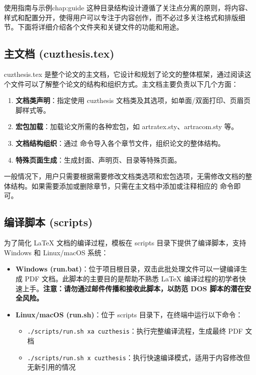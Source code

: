 \begin{cuzchapter}{使用指南与示例}{chap:guide}
    这种目录结构设计遵循了关注点分离的原则，将内容、样式和配置分开，使得用户可以专注于内容创作，而不必过多关注格式和排版细节。下面将详细介绍各个文件夹和关键文件的功能和用途。

    \subsection{主文档 (cuzthesis.tex)}\label{sub:cuzthesis}

    cuzthesis.tex 是整个论文的主文档，它设计和规划了论文的整体框架，通过阅读这个文件可以了解整个论文的结构和组织方式。主文档主要负责以下几个方面：

    \begin{enumerate}
        \item \textbf{文档类声明}：指定使用 cuzthesis 文档类及其选项，如单面/双面打印、页眉页脚样式等。
        \item \textbf{宏包加载}：加载论文所需的各种宏包，如 artratex.sty、artracom.sty 等。
        \item \textbf{文档结构组织}：通过 \verb|| 命令导入各个章节文件，组织论文的整体结构。
        \item \textbf{特殊页面生成}：生成封面、声明页、目录等特殊页面。
    \end{enumerate}

    一般情况下，用户只需要根据需要修改文档类选项和宏包选项，无需修改文档的整体结构。如果需要添加或删除章节，只需在主文档中添加或注释相应的 \verb|| 命令即可。

    \subsection{编译脚本 (scripts)}\label{sub:scripts}

    为了简化 \LaTeX{} 文档的编译过程，模板在 scripts 目录下提供了编译脚本，支持 Windows 和 Linux/macOS 系统：

    \begin{itemize}
        \item \textbf{Windows (run.bat)}：位于项目根目录，双击此批处理文件可以一键编译生成 PDF 文档。此脚本的主要目的是帮助不熟悉 \LaTeX{} 编译过程的初学者快速上手。\textbf{注意：请勿通过邮件传播和接收此脚本，以防范 DOS 脚本的潜在安全风险。}

        \item \textbf{Linux/macOS (run.sh)}：位于 scripts 目录下，在终端中运行以下命令：
              \begin{itemize}
                  \item \verb|./scripts/run.sh xa cuzthesis|：执行完整编译流程，生成最终 PDF 文档
                  \item \verb|./scripts/run.sh x cuzthesis|：执行快速编译模式，适用于内容修改但无新引用的情况
              \end{itemize}


\end{itemize}
\end{cuzchapter}
